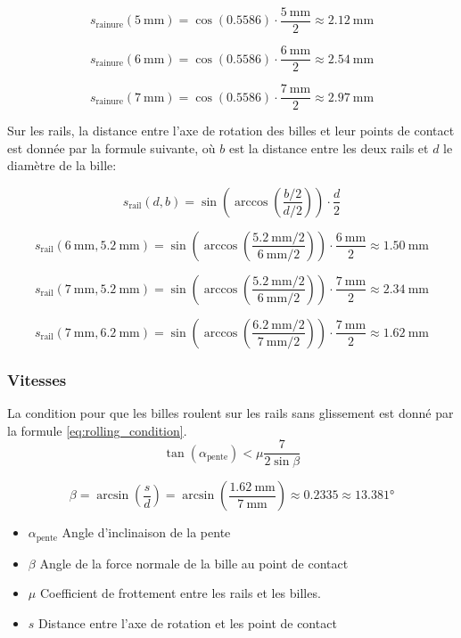\[s_{\text{rainure}}(\SI{5}{\milli\metre}) = \cos(0.5586) \cdot \frac{\SI{5}{\milli\metre}}{2} \approx \SI{2.12}{\milli\metre}\]

\[s_{\text{rainure}}(\SI{6}{\milli\metre}) = \cos(0.5586) \cdot \frac{\SI{6}{\milli\metre}}{2} \approx \SI{2.54}{\milli\metre}\]

\[s_{\text{rainure}}(\SI{7}{\milli\metre}) = \cos(0.5586) \cdot \frac{\SI{7}{\milli\metre}}{2} \approx \SI{2.97}{\milli\metre}\]

Sur les rails, la distance entre l'axe de rotation des billes et leur points de contact est donnée par la formule suivante, où $b$ est la distance entre les deux rails et $d$ le diamètre de la bille:

\[s_{\text{rail}}(d,b) = \sin\left(\arccos\left(\frac{b/2}{d/2}\right)\right) \cdot \frac{d}{2}\]

\[s_{\text{rail}}(\SI{6}{\milli\metre},\SI{5.2}{\milli\metre}) = \sin\left(\arccos\left(\frac{\SI{5.2}{\milli\metre}/2}{\SI{6}{\milli\metre}/2}\right)\right) \cdot \frac{{\SI{6}{\milli\metre}}}{2} \approx \SI{1.50}{\milli\metre}\]

\[s_{\text{rail}}(\SI{7}{\milli\metre},\SI{5.2}{\milli\metre}) = \sin\left(\arccos\left(\frac{\SI{5.2}{\milli\metre}/2}{\SI{6}{\milli\metre}/2}\right)\right) \cdot \frac{{\SI{7}{\milli\metre}}}{2} \approx \SI{2.34}{\milli\metre}\]

\[s_{\text{rail}}(\SI{7}{\milli\metre},\SI{6.2}{\milli\metre}) = \sin\left(\arccos\left(\frac{\SI{6.2}{\milli\metre}/2}{\SI{7}{\milli\metre}/2}\right)\right) \cdot \frac{{\SI{7}{\milli\metre}}}{2} \approx \SI{1.62}{\milli\metre}\]

\subsubsection{Vitesses}
La condition pour que les billes roulent sur les rails sans glissement est donné par la formule \ref{eq:rolling_condition}.
\begin{equation}
    \tan(\alpha_{\text{pente}}) < \mu \frac{7}{2\sin{\beta}}
    \label{eq:rolling_condition}
\end{equation}

\[\beta = \arcsin\left(\frac{s}{d}\right) = \arcsin\left(\frac{\SI{1.62}{\milli\metre}}{\SI{7}{\milli\metre}}\right) \approx \num{0.2335} \approx \ang{13.381}\]

\begin{itemize}[label={}, noitemsep]
	\item $\alpha_{\text{pente}}$ \tabto{\tabtoX} Angle d'inclinaison de la pente
	\item $\beta$ \tabto{\tabtoX} Angle de la force normale de la bille au point de contact
	\item $\mu$ \tabto{\tabtoX} Coefficient de frottement entre les rails et les billes.
	\item $s$ \tabto{\tabtoX} Distance entre l'axe de rotation et les point de contact
\end{itemize}

